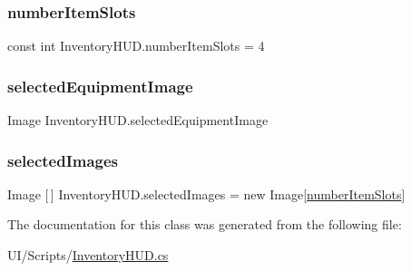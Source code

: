 \mbox{\label{class_inventory_h_u_d_a77d964ce00ac7306d8193216e1f18262}} 
\subsubsection{\texorpdfstring{number\+Item\+Slots}{numberItemSlots}}
{\footnotesize\ttfamily const int Inventory\+H\+U\+D.\+number\+Item\+Slots = 4}

\mbox{\label{class_inventory_h_u_d_a80bf1b719c37d2b3cdeec5b8461d1533}} 
\subsubsection{\texorpdfstring{selected\+Equipment\+Image}{selectedEquipmentImage}}
{\footnotesize\ttfamily Image Inventory\+H\+U\+D.\+selected\+Equipment\+Image}

\mbox{\label{class_inventory_h_u_d_a0edf11c38f1debf4bb69f9f976f3ab48}} 
\subsubsection{\texorpdfstring{selected\+Images}{selectedImages}}
{\footnotesize\ttfamily Image \mbox{[}$\,$\mbox{]} Inventory\+H\+U\+D.\+selected\+Images = new Image\mbox{[}\mbox{\hyperlink{class_inventory_h_u_d_a77d964ce00ac7306d8193216e1f18262}{number\+Item\+Slots}}\mbox{]}}



The documentation for this class was generated from the following file\+:\begin{DoxyCompactItemize}
\item 
U\+I/\+Scripts/\mbox{\hyperlink{_inventory_h_u_d_8cs}{Inventory\+H\+U\+D.\+cs}}\end{DoxyCompactItemize}

